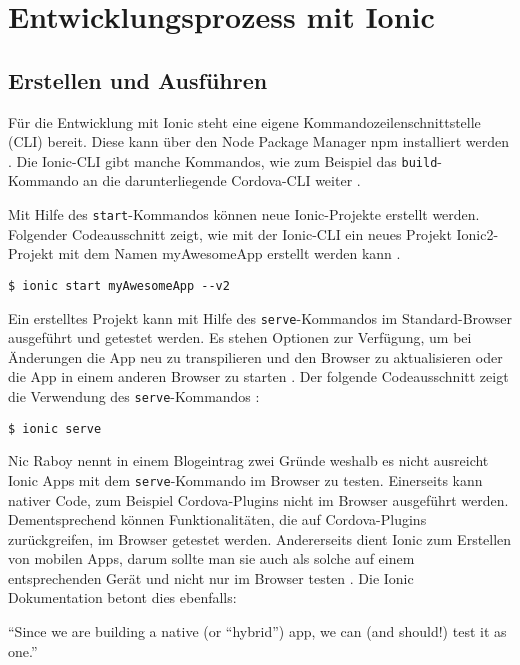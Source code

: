 \chapter{Entwicklungsprozess mit Ionic}
\label{Entwicklungsprozess}

\section{Erstellen und Ausführen}

Für die Entwicklung mit Ionic steht eine eigene Kommandozeilenschnittstelle (CLI) bereit. Diese kann über den Node Package Manager npm installiert werden \cite{ionic:cli}. Die Ionic-CLI gibt manche Kommandos, wie zum Beispiel das \texttt{build}-Kommando an die darunterliegende Cordova-CLI weiter \cite{ionic:build}.

Mit Hilfe des \texttt{start}-Kommandos können neue Ionic-Projekte erstellt werden. Folgender Codeausschnitt zeigt, wie mit der Ionic-CLI ein neues Projekt Ionic2-Projekt mit dem Namen myAwesomeApp erstellt werden kann \cite{ionic:cli}.
\begin{codebox}
\begin{lstlisting}[style=typescript]
$ ionic start myAwesomeApp --v2
\end{lstlisting}
\end{codebox}

Ein erstelltes Projekt kann mit Hilfe des \texttt{serve}-Kommandos im Standard-Browser ausgeführt und getestet werden. Es stehen Optionen zur Verfügung, um bei Änderungen die App neu zu transpilieren und den Browser zu aktualisieren oder die App in einem anderen Browser zu starten \cite{ionic:serve}. Der folgende Codeausschnitt zeigt die Verwendung des \texttt{serve}-Kommandos \cite{ionic:cli}:
\begin{codebox}
\begin{lstlisting}[style=typescript]
$ ionic serve
\end{lstlisting}
\end{codebox}

Nic Raboy nennt in einem Blogeintrag zwei Gründe weshalb es nicht ausreicht Ionic Apps mit dem \texttt{serve}-Kommando im Browser zu testen. Einerseits kann nativer Code, zum Beispiel Cordova-Plugins nicht im Browser ausgeführt werden. Dementsprechend können Funktionalitäten, die auf Cordova-Plugins zurückgreifen, im Browser getestet werden. Andererseits dient Ionic zum Erstellen von mobilen Apps, darum sollte man sie auch als solche auf einem entsprechenden Gerät und nicht nur im Browser testen \cite{raboy:serve}. Die Ionic Dokumentation betont dies ebenfalls:
\begin{citeenv}
	``Since we are building a native (or “hybrid”) app, we can (and should!) test it as one.'' \cite{ionic:testing}
\end{citeenv}

